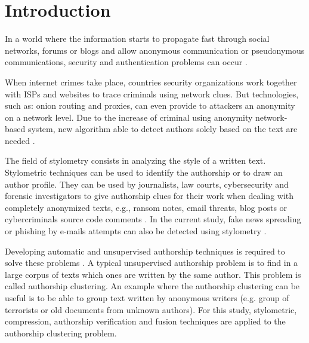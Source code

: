
\chapter{Introduction \label{sec:introduction}}

In a world where the information starts to propagate fast through social networks, forums or blogs and allow anonymous communication or pseudonymous communications, security and authentication problems can occur \cite{automated_unsupervised} \cite{kocher_pan16}.

When internet crimes take place, countries security organizations work together with ISPs and websites to trace criminals using network clues.
But technologies, such as: onion routing and proxies, can even provide to attackers an anonymity on a network level.
Due to the increase of criminal using anonymity network-based system, new algorithm able to detect authors solely based on the text are needed \cite{automated_unsupervised} \cite{attribution_in_cyberspace}.

The field of stylometry consists in analyzing the style of a written text.
Stylometric techniques can be used to identify the authorship or to draw an author profile.
They can be used by journalists, law courts, cybersecurity and forensic investigators to give authorship clues for their work when dealing with completely anonymized texts, e.g., ransom notes, email threats, blog posts or cybercriminals source code comments \cite{pan16_clustering_site}.
In the current study, fake news spreading or phishing by e-mails attempts can also be detected using stylometry \cite{unine_pan20_fake_news}.

Developing automatic and unsupervised authorship techniques is required to solve these problems \cite{automated_unsupervised}.
A typical unsupervised authorship problem is to find in a large corpus of texts which ones are written by the same author.
This problem is called authorship clustering.
An example where the authorship clustering can be useful is to be able to group text written by anonymous writers (e.g. group of terrorists or old documents from unknown authors).
For this study, stylometric, compression, authorship verification and fusion techniques are applied to the authorship clustering problem.





